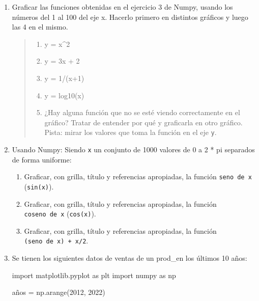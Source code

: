 \documentclass[
  letterpaper,
  DIV=11,
  numbers=noendperiod]{scrreprt}
\newenvironment{Shaded}{\begin{snugshade}}{\end{snugshade}}
\newcommand{\DecValTok}[1]{\textcolor[rgb]{0.68,0.00,0.00}{#1}}
\newcommand{\ImportTok}[1]{\textcolor[rgb]{0.00,0.46,0.62}{#1}}
\newcommand{\NormalTok}[1]{\textcolor[rgb]{0.00,0.23,0.31}{#1}}
\newcommand{\OperatorTok}[1]{\textcolor[rgb]{0.37,0.37,0.37}{#1}}
\providecommand{\tightlist}{%
  \setlength{\itemsep}{0pt}\setlength{\parskip}{0pt}}\usepackage{longtable,booktabs,array}
\begin{document}
\begin{enumerate}
\def\labelenumi{\arabic{enumi}.}
\item
  Graficar las funciones obtenidas en el ejercicio 3 de Numpy, usando
  los números del 1 al 100 del eje x. Hacerlo primero en distintos
  gráficos y luego las 4 en el mismo.

  \begin{quote}
  \begin{enumerate}
  \def\labelenumii{\alph{enumii}.}
  \tightlist
  \item
    y = x\^{}2
  \item
    y = 3x + 2
  \item
    y = 1/(x+1)
  \item
    y = log10(x)
  \item
    ¿Hay alguna función que no se esté viendo correctamente en el
    gráfico? Tratar de entender por qué y graficarla en otro gráfico.
    Pista: mirar los valores que toma la función en el eje \texttt{y}.
  \end{enumerate}
  \end{quote}
\item
  Usando Numpy: Siendo \texttt{x} un conjunto de 1000 valores de 0 a 2 *
  pi separados de forma uniforme:

  \begin{enumerate}
  \def\labelenumii{\alph{enumii}.}
  \tightlist
  \item
    Graficar, con grilla, título y referencias apropiadas, la función
    \texttt{seno\ de\ x} (\texttt{sin(x)}).
  \item
    Graficar, con grilla, título y referencias apropiadas, la función
    \texttt{coseno\ de\ x} (\texttt{cos(x)}).
  \item
    Graficar, con grilla, título y referencias apropiadas, la función
    \texttt{(seno\ de\ x)\ +\ x/2}.
  \end{enumerate}
\item
  Se tienen los siguientes datos de ventas de un prod\_en los últimos 10
  años:

\begin{Shaded}
\begin{Highlighting}[]
\ImportTok{import}\NormalTok{ matplotlib.pyplot }\ImportTok{as}\NormalTok{ plt}
\ImportTok{import}\NormalTok{ numpy }\ImportTok{as}\NormalTok{ np}

\NormalTok{años }\OperatorTok{=}\NormalTok{ np.arange(}\DecValTok{2012}\NormalTok{, }\DecValTok{2022}\NormalTok{)}


\end{Highlighting}
\end{Shaded}
\end{enumerate}
\end{document}
